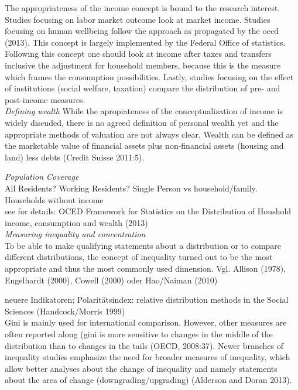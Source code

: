 \documentclass[twoside]{article}\usepackage[]{graphicx}\usepackage[]{color}
\begin{document}
\begin{multicols}{2}
The appropriateness of the income concept is bound to the research interest. Studies focusing on labor market outcome look at market income. Studies focusing on human wellbeing follow the approach as propagated by the oecd (2013). This concept is largely implemented by the Federal Office of statistics. Following this concept one should look at income after taxes and transfers inclusive the adjustment for household members, because this is the measure which frames the consumption possibilities. Lastly, studies focusing on the effect of institutions (social welfare, taxation) compare the distribution of pre- and post-income measures. \\   

\emph{Defining wealth}
While the apropiateness of the conceptualization of income is widely discuded, there is no agreed definition of personal wealth yet and the appropriate methods of valuation are not always clear. 
Wealth can be defined as the marketable value of financial assets plus non-financial assets (housing and land) less debts (Credit Suisse 2011:5).

\emph{Population Coverage} \\
All Residents? Working Residents? Single Person vs household/family. Households without income \\
see for details: OCED Framework for Statistics on the Distribution of Houshold income, consumption and wealth (2013) \\

\emph{Measuring inequality and concentration} \\
To be able to make qualifying statements about a distribution or to compare different distributions, the concept of inequality turned out to be the most appropriate and thus the most commonly used dimension. Vgl. Allison (1978), Engelhardt (2000), Cowell (2000) oder Hao/Naiman (2010)

neuere Indikatoren; Polaritätsindex: relative distribution methods in the Social Sciences (Handcock/Morris 1999) \\

Gini is mainly used for international comparison. However, other measures are often reported along (gini is more sensitive to changes in the middle of the distribution than to changes in the tails (OECD, 2008:37). Newer branches of inequality studies emphasize the need for broader measures of inequality, which allow better analyses about the change of inequality and namely statements about the area of change (downgrading/upgrading) (Alderson and Doran 2013). \\


\end{multicols}
\end{document}
